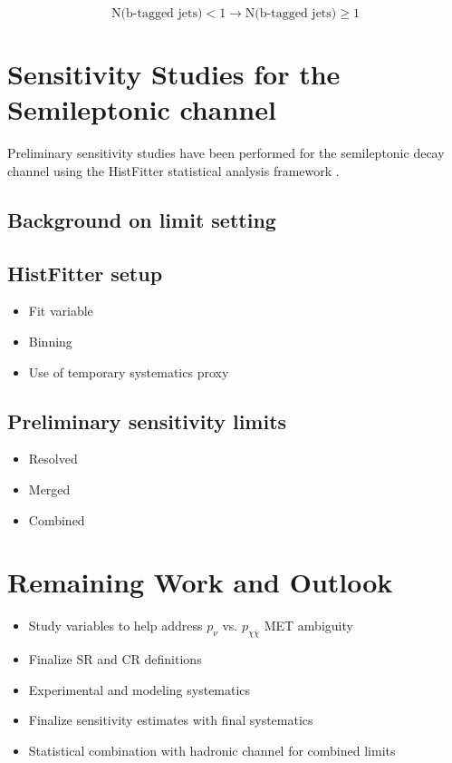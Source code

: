 \documentclass[12pt]{article}
\begin{document}
$$
\text{N(b-tagged jets)} <1 \rightarrow \text{N(b-tagged jets)} \geq1
$$

\newpage

\section{Sensitivity Studies for the Semileptonic channel}

Preliminary sensitivity studies have been performed for the semileptonic decay channel using the HistFitter statistical analysis framework \cite{Baak:2014wma}. 
\subsection{Background on limit setting}

\subsection{HistFitter setup}
\begin{itemize}
\item Fit variable
\item Binning
\item Use of temporary systematics proxy
\end{itemize}
\subsection{Preliminary sensitivity limits}
\begin{itemize}
\item Resolved 
\item Merged 
\item Combined
\end{itemize}

\section{Remaining Work and Outlook}
\begin{itemize}
\item Study variables to help address $p_\nu$ vs. $p_{\chi\bar{\chi}}$ MET ambiguity
\item Finalize SR and CR definitions
\item Experimental and modeling systematics
\item Finalize sensitivity estimates with final systematics
\item Statistical combination with hadronic channel for combined limits
\end{itemize}

\newpage



\end{document}
